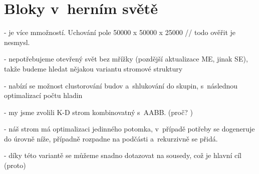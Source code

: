 
\section{Bloky v~herním světě}


- je více mmožností. Uchování pole 50000 x 50000 x 25000 // todo ověřit
je nesmysl. 

- nepotřebujeme otevřený svět bez mřížky (pozdější aktualizace ME, jinak SE), takže budeme hledat nějakou variantu stromové struktury

- nabízí se možnost clustorování budov a~shlukování do skupin, s~následnou optimalizací počtu hladin

- my jsme zvolili K-D strom kombinovatný s~AABB. (proč? )

- náš strom má optimalizaci jedinného potomka, v~případě potřeby se dogeneruje do úrovně níže, případně rozpadne na podčásti a~rekurzivně se přidá.

- díky této variantě se můžeme snadno dotazovat na sousedy, což je hlavní cíl (proto)

